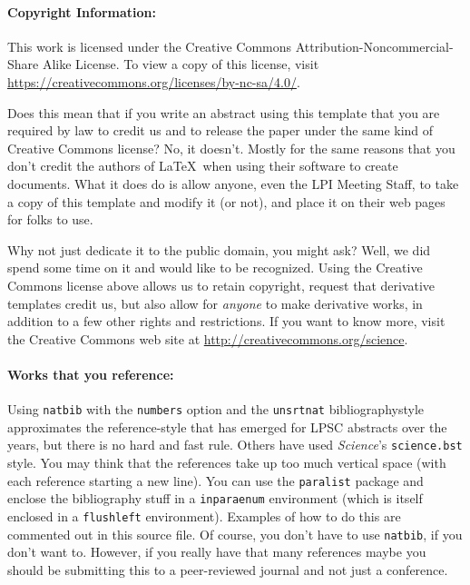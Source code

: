 \documentclass[twoside]{article}
\begin{document}
\paragraph{Copyright Information:}

This work is licensed under the Creative Commons
Attribution-Noncommercial-Share Alike License. To view a copy
of this license, visit \url{https://creativecommons.org/licenses/by-nc-sa/4.0/}.

Does this mean that if you write an abstract using this template that
you are required by law to credit us and to release the paper under
the same kind of Creative Commons license?  No, it doesn't.  Mostly
for the same reasons that you don't credit the authors of \LaTeX\
when using their software to create documents.  What it does do is allow
anyone, even the LPI Meeting Staff, to take a copy of this template
and modify it (or not), and place it on their web pages for folks
to use.

Why not just dedicate it to the public domain, you might ask?  Well,
we did spend some time on it and would like to be recognized.  Using
the Creative Commons license above allows us to retain copyright,
request that derivative templates credit us, but also allow for
\emph{anyone} to make derivative works, in addition to a few other
rights and restrictions.  If you want to know more, visit the
Creative Commons web site at \url{http://creativecommons.org/science}.


\paragraph{Works that you reference:}

Using \texttt{natbib} with the \texttt{numbers} option and the
\texttt{unsrtnat} bibliographystyle approximates the reference-style
that has emerged for LPSC abstracts over the years, but there is
no hard and fast rule.  Others have used \emph{Science}'s
\texttt{science.bst} style. You may think that the references take
up too much vertical space (with each reference starting a new
line).  You can use the \texttt{paralist} package and enclose the
bibliography stuff in a \texttt{inparaenum} environment (which is
itself enclosed in a \texttt{flushleft} environment).  Examples of
how to do this are commented out in this source file.  Of course,
you don't have to use \texttt{natbib}, if you don't want to.  However,
if you really have that many references maybe you should be submitting
this to a peer-reviewed journal and not just a conference.
\end{document}
